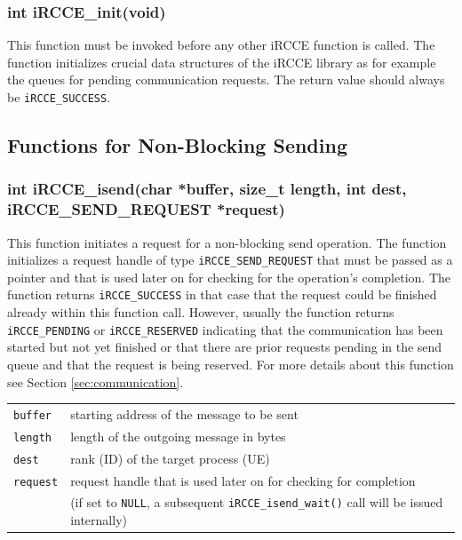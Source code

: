\documentclass[fontsize=10pt, paper=a4, DIV12, pagesize=auto]{scrartcl}
\begin{document}
\subsubsection{int iRCCE\_init(void)}\vspace{-0.3cm}
This function must be invoked before any other iRCCE function is called.
The function initializes crucial data structures of the iRCCE library as for example the queues for pending communication requests. The return value should always be \texttt{iRCCE\_SUCCESS}.


\subsection{Functions for Non-Blocking Sending}

\subsubsection{int iRCCE\_isend(char *buffer, size\_t length, int dest, iRCCE\_SEND\_REQUEST *request)}\vspace{-0.3cm}
This function initiates a request for a non-blocking send operation. The function initializes a request handle of type \texttt{iRCCE\_SEND\_REQUEST} that must be passed as a pointer and that is used later on for checking for the operation's completion.
The function returns \texttt{iRCCE\_SUCCESS} in that case that the request could be finished already within this function call.
However, usually the function returns \texttt{iRCCE\_PENDING} or \texttt{iRCCE\_RESERVED} indicating that the communication has been started but not yet finished or that there are prior requests pending in the send queue and that the request is being reserved.
For more details about this function see Section \ref{sec:communication}.

\begin{tabular}{ll}
\texttt{buffer}  & starting address of the message to be sent \\
\texttt{length}  & length of the outgoing message in bytes \\
\texttt{dest}    & rank (ID) of the target process (UE) \\
\texttt{request} & request handle that is used later on for checking for completion \\
                 & (if set to \texttt{NULL}, a subsequent \texttt{iRCCE\_isend\_wait()} call will be issued internally)
\hspace{2.0cm}
\end{tabular}
\end{document}
